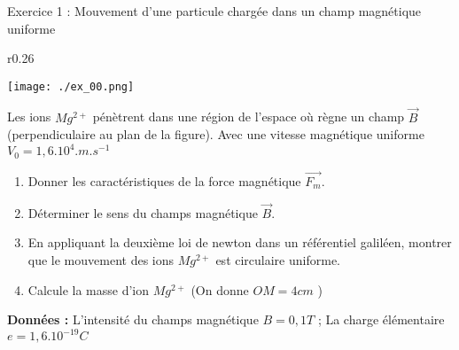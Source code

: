 \documentclass[12pt, french]{article}
\begin{document}
\begin{center}

\end{center}

\vspace{-0.2cm}
   \begin{Box2}{Exercice 1 : Mouvement d'une particule chargée dans un champ
magnétique uniforme}

	\begin{wrapfigure}[4]{r}{0.26\textwidth}
  \begin{center}
	  \vspace{-0.6cm}
	\texttt{[image: ./ex\_00.png]}
  \end{center}
\end{wrapfigure}

Les ions $Mg^{2+}$ pénètrent dans une région de l'espace où règne un champ $\vec{B}$(perpendiculaire au plan de la figure). Avec une vitesse
magnétique uniforme  $V_0 =1,6.10^4.m.s^{-1}$
\begin{enumerate}


	\item  Donner les caractéristiques de la force magnétique $\vec{F_m}$.
	\item  Déterminer le sens du champs magnétique $\vec{B}$.
	\item  En appliquant la deuxième loi de newton dans un référentiel galiléen,
		montrer que le mouvement des ions $Mg^{2+}$ est circulaire uniforme.
	\item  Calcule la masse d'ion $Mg^{2+}$ (On donne $OM = 4 cm$ )

\end{enumerate}

\textbf{Données :} L'intensité du champs magnétique $B= 0,1T$ ; La charge élémentaire $e = 1, 6.10^{-19} C$


   \end{Box2}
\end{document}

